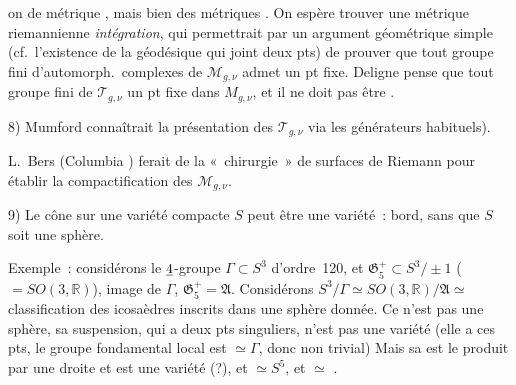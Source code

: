 \documentclass[11pt,a4paper]{article}
\begin{document}
on  de métrique
 , mais bien des
métriques . On espère trouver une métrique
riemannienne \ill{} \emph{intégration}, qui permettrait par un argument
géométrique simple (cf.\ l'existence  de la
géodésique qui joint deux pts) de prouver que tout groupe fini
d'automorph.\ complexes de $\mathcal{M}_{g,\nu}$ admet un pt fixe.
Deligne pense que  tout groupe fini de
$\mathcal{T}_{g,\nu}$  un pt fixe dans $M_{g,\nu}$, et
il ne doit pas être \ill{} \ill{}.


8) Mumford connaîtrait la présentation des $\mathcal{T}_{g,\nu}$ via les
générateurs habituels).

L.~Bers (Columbia ) ferait de la «~chirurgie~» de
surfaces de Riemann pour  établir la compactification
des $\mathcal{M}_{g,\nu}$.

9) Le cône sur une variété compacte $S$ peut être une variété~: bord,
sans que $S$ soit une sphère.

Exemple~: considérons le $\uncertain{4}$-groupe $\Gamma\subset S^3$
d'ordre~120, \struck{\ill{}} et
$\mathfrak{G}^{+}_{5}\subset S^3/\pm1$ ($=SO(3,\mathbb{R})$), image de
$\Gamma$, $\mathfrak{G}^{+}_{5}=\mathfrak{A}$. Considérons
$S^3/\Gamma\simeq SO(3,\mathbb{R})/\mathfrak{A}\simeq{}$classification
des icosaèdres  inscrits dans une sphère
donnée. Ce n'est pas une sphère, \struck{\ill{}} sa suspension, qui a
deux pts singuliers, n'est pas une variété (elle a  ces
pts, le groupe fondamental local est $\simeq\Gamma$, donc non trivial)
Mais  \add{\ill{}} sa 
  est
 le produit par une droite et
\struck{\ill{}} est une variété (?), et $\simeq S^5$, et $\simeq$
\ill{} .

\end{document}
